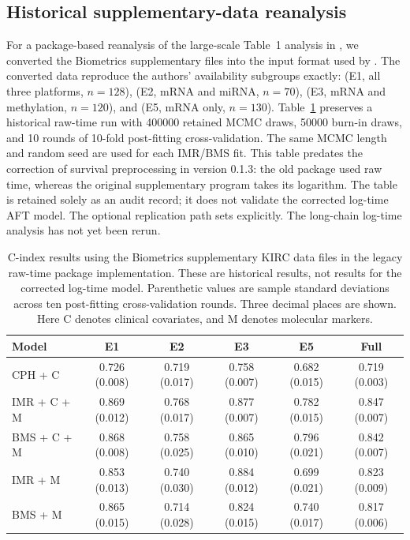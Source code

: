 \subsection{Historical supplementary-data reanalysis}

For a package-based reanalysis of the large-scale Table~1 analysis in
\citet{chekouo2017}, we converted the Biometrics supplementary files into the
input format used by .  The converted data reproduce the
authors' availability subgroups exactly:  (E1, all three platforms,
$n=128$),  (E2, mRNA and miRNA, $n=70$),  (E3, mRNA and
methylation, $n=120$), and  (E5, mRNA only, $n=130$).
Table~\ref{tab:kirc-supplement} preserves a historical raw-time run with 400000 retained
MCMC draws, 50000 burn-in draws, and 10 rounds of 10-fold post-fitting
cross-validation.  The same MCMC length and random seed are used for each
IMR/BMS fit. This table predates the correction of survival preprocessing in
version 0.1.3: the old package used raw time, whereas the original supplementary
program takes its logarithm. The table is retained solely as an audit record;
it does not validate the corrected log-time AFT model. The optional replication
path sets  explicitly. The long-chain
log-time analysis has not yet been rerun.

\begin{table}[H]
\centering
\small
\begin{tabular}{l c c c c c}
\hline
Model & E1 & E2 & E3 & E5 & Full \\
\hline
CPH + C     & 0.726 (0.008) & 0.719 (0.017) & 0.758 (0.007) & 0.682 (0.015) & 0.719 (0.003) \\
IMR + C + M & 0.869 (0.012) & 0.768 (0.017) & 0.877 (0.007) & 0.782 (0.015) & 0.847 (0.007) \\
BMS + C + M & 0.868 (0.008) & 0.758 (0.025) & 0.865 (0.010) & 0.796 (0.021) & 0.842 (0.007) \\
IMR + M     & 0.853 (0.013) & 0.740 (0.030) & 0.884 (0.012) & 0.699 (0.021) & 0.823 (0.009) \\
BMS + M     & 0.865 (0.015) & 0.714 (0.028) & 0.824 (0.015) & 0.740 (0.017) & 0.817 (0.006) \\
\hline
\end{tabular}
\caption{\label{tab:kirc-supplement}C-index results using the Biometrics
supplementary KIRC data files in the legacy raw-time package implementation.
These are historical results, not results for the corrected log-time model. Parenthetic values are sample standard
deviations across ten post-fitting cross-validation rounds. Three decimal
places are shown. Here C denotes clinical covariates, and M denotes molecular
markers.}
\end{table}
\FloatBarrier

